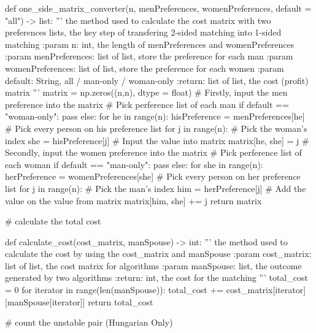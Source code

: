 \documentclass[14pt]{extarticle}
\begin{document}
\begin{python}
def one_side_matrix_converter(n, menPreferences, womenPreferences, default = "all") -> list:
    '''
    the method used to calculate the cost matrix with two preferences lists, the key step of transfering 2-sided matching into 1-sided matching
    :param n: int, the length of menPreferences and womenPreferences
    :param menPreferences: list of list, store the preference for each man
    :param womenPreferences: list of list, store the preference for each women
    :param default: String, all / man-only / woman-only
    :return: list of list, the cost (profit) matrix
    '''
    matrix = np.zeros((n,n), dtype = float)
    # Firstly, input the men preference into the matrix
    # Pick perference list of each man
    if default == "woman-only":
        pass
    else:
        for he in range(n):
            hisPreference = menPreferences[he]
            # Pick every person on his preference list
            for j in range(n):
                # Pick the woman's index 
                she = hisPreference[j]   
                # Input the value into matrix
                matrix[he, she] = j  
    # Secondly, input the women preference into the matrix
    # Pick perference list of each woman
    if default == "man-only":
        pass
    else:
        for she in range(n):
            herPreference = womenPreferences[she]
            # Pick every person on her preference list
            for j in range(n):
                # Pick the man's index 
                him = herPreference[j]
                # Add the value on the value from matrix
                matrix[him, she] += j    
    return matrix         

# calculate the total cost

def calculate_cost(cost_matrix, manSpouse) -> int:
    '''
    the method used to calculate the cost by using the cost_matrix and manSpouse
    :param cost_matrix: list of list, the cost matrix for algorithms
    :param manSpouse: list, the outcome generated by two algorithms
    :return: int, the cost for the matching
    '''
    total_cost = 0
    for iterator in range(len(manSpouse)):
       total_cost += cost_matrix[iterator][manSpouse[iterator]] 
    return total_cost  

# count the unstable pair (Hungarian Only)
     

\end{python}
\end{document}
